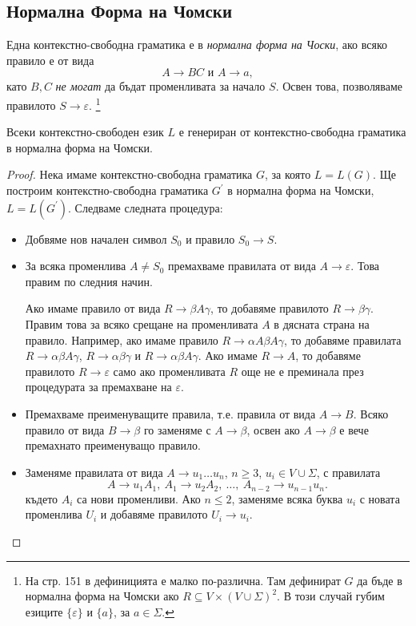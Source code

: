 \subsection{Нормална Форма на Чомски}

\begin{dfn}
Една контекстно-свободна граматика е в {\em нормална форма на Чоски}, ако
всяко правило е от вида
\[A \rightarrow BC\mbox{ и }A \rightarrow a,\]
като $B, C$ {\em не могат} да бъдат променливата за начало $S$.
Освен това, позволяваме правилото $S\to\varepsilon$.
\footnote{На стр. 151 в \cite{papadimitriou} дефиницията е малко по-различна.
Там дефинират $G$ да бъде в нормална форма на Чомски ако $R \subseteq V\times(V\cup\Sigma)^2$.
В този случай губим езиците $\{\varepsilon\}$ и $\{a\}$, за $a\in\Sigma$.}
\end{dfn}

\begin{thm}
  Всеки контекстно-свободен език $L$ е генериран от контекстно-свободна
  граматика в нормална форма на Чомски.
\end{thm}
\begin{proof}
  Нека имаме контекстно-свободна граматика $G$, за която $L = L(G)$.
  Ще построим контекстно-свободна граматика $G^\prime$ в нормална форма на Чомски, $L = L(G^\prime)$.
  Следваме следната процедура:
  \begin{itemize}
  \item
    Добвяме нов начален символ $S_0$ и правило $S_0 \to S$.
  \item
    За всяка променлива $A \neq S_0$ премахваме правилата от вида $A\to\varepsilon$.
    Това правим по следния начин.
    
    Ако имаме правило от вида $R\to \beta A\gamma$, то добавяме правилото $R\to \beta\gamma$.
    Правим това за всяко срещане на променливата $A$ в дясната страна на правило.
    Например, ако имаме правило $R\to \alpha A\beta A \gamma$, то добавяме правилата $R \to \alpha\beta A\gamma$,
    $R\to \alpha\beta\gamma$ и $R\to \alpha\beta A\gamma$.
    Ако имаме $R\to A$, то добавяме правилото $R\to\varepsilon$
    само ако променливата $R$ още не е преминала през процедурата за премахване на $\varepsilon$.
  \item
    Премахваме преименуващите правила, т.е. правила от вида $A\to B$.
    Всяко правило от вида $B \to \beta$ го заменяме с $A\to \beta$,
    освен ако $A \to \beta$ е вече премахнато преименуващо правило.
  \item
    Заменяме правилата от вида $A\to u_1\dots u_n$, $n\geq 3$, $u_i \in V\cup\Sigma$, с
    правилата \[A\to u_1A_1,\ A_1\to u_2A_2,\ \dots,\ A_{n-2} \to u_{n-1}u_n.\]
    където $A_i$ са нови променливи.
    Ако $n\leq 2$, заменяме всяка буква $u_i$ с новата променлива $U_i$
    и добавяме правилото $U_i\to u_i$.
  \end{itemize}
\end{proof}

